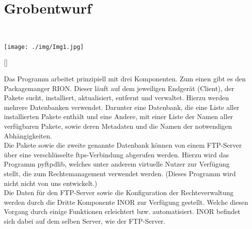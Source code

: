 \chapter{Grobentwurf}
\\[\intextsep]
\begin{minipage}{\linewidth}
\centering%
\texttt{[image: ./img/Img1.jpg]}%
\label{fig:Image 1}%
\end{minipage}
[\intextsep]

Das Programm arbeitet prinzipiell mit drei Komponenten. Zum einen gibt es den
Packagemanger RION. Dieser läuft auf dem jeweiligen Endgerät (Client), der Pakete sucht,
installiert, aktualisiert, entfernt und verwaltet. Hierzu werden mehrere Datenbanken
verwendet. Darunter eine Datenbank, die eine Liste aller installierten Pakete enthält und eine
Andere, mit einer Liste der Namen aller verfügbaren Pakete, sowie deren Metadaten und die
Namen der notwendigen Abhängigkeiten. \\


Die Pakete sowie die zweite genannte Datenbank können von einem FTP-Server über eine
verschlüsselte ftps-Verbindung abgerufen werden. Hierzu wird das Programm pyftpdlib,
welches unter anderem virtuelle Nutzer zur Verfügung stellt, die zum Rechtemanagement
verwendet werden. (Dieses Programm wird nicht nicht von uns entwickelt.)
\\

Die Daten für den FTP-Server sowie die Konfiguration der Rechteverwaltung werden durch
die Dritte Komponente INOR zur Verfügung gestellt. Welche diesen Vorgang durch einige
Funktionen erleichtert bzw. automatisiert. INOR befindet sich dabei auf dem selben Server,
wie der FTP-Server.\\   
